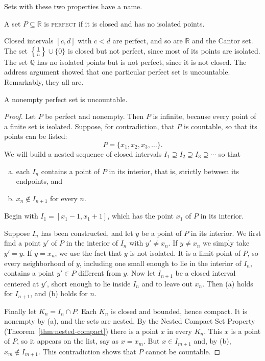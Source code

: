 Sets with these two properties have a name.

\begin{definition}
A set $P \subseteq \mathbb{R}$ is \textsc{perfect} if it is closed and has no isolated points.
\end{definition}

Closed intervals $[c,d]$ with $c < d$ are perfect, and so are $\mathbb{R}$ and the Cantor set.  The set $\left\{\frac1n\right\} \cup \{0\}$ is closed but not perfect, since most of its points are isolated.  The set $\mathbb{Q}$ has no isolated points but is not perfect, since it is not closed.  The address argument showed that one particular perfect set is uncountable.  Remarkably, they all are.

\begin{theorem}\label{thm:perfect-uncountable}
A nonempty perfect set is uncountable.
\end{theorem}

\begin{proof}
Let $P$ be perfect and nonempty.  Then $P$ is infinite, because every point of a finite set is isolated.  Suppose, for contradiction, that $P$ is countable, so that its points can be listed:
\[ P = \{x_1, x_2, x_3, \ldots\}. \]
We will build a nested sequence of closed intervals $I_1 \supseteq I_2 \supseteq I_3 \supseteq \cdots$ so that
\begin{enumerate}[(a)]
	\item each $I_n$ contains a point of $P$ in its interior, that is, strictly between its endpoints, and
	\item $x_n \notin I_{n+1}$ for every $n$.
\end{enumerate}
Begin with $I_1 = [x_1 - 1, x_1 + 1]$, which has the point $x_1$ of $P$ in its interior.

Suppose $I_n$ has been constructed, and let $y$ be a point of $P$ in its interior.  We first find a point $y'$ of $P$ in the interior of $I_n$ with $y' \neq x_n$.  If $y \neq x_n$ we simply take $y' = y$.  If $y = x_n$, we use the fact that $y$ is not isolated.  It is a limit point of $P$, so every neighborhood of $y$, including one small enough to lie in the interior of $I_n$, contains a point $y' \in P$ different from $y$.  Now let $I_{n+1}$ be a closed interval centered at $y'$, short enough to lie inside $I_n$ and to leave out $x_n$.  Then (a) holds for $I_{n+1}$, and (b) holds for $n$.

Finally let $K_n = I_n \cap P$.  Each $K_n$ is closed and bounded, hence compact.  It is nonempty by (a), and the sets are nested.  By the Nested Compact Set Property (Theorem~\ref{thm:nested-compact}) there is a point $x$ in every $K_n$.  This $x$ is a point of $P$, so it appears on the list, say as $x = x_m$.  But $x \in I_{m+1}$ and, by (b), $x_m \notin I_{m+1}$.  This contradiction shows that $P$ cannot be countable.
\end{proof}

